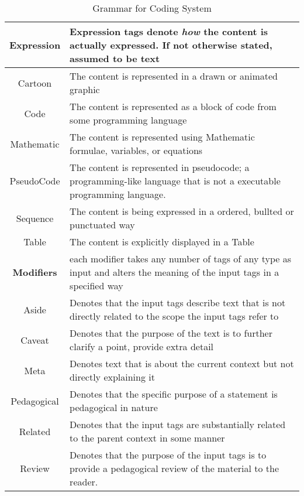 \begin{table}[h!]
\begin{tabular}{c p{1.8\linewidth}}
    
    \textbf{Expression} & Expression tags denote \emph{how }the content is actually expressed. If not otherwise stated, assumed to be text \\
    \hline
    Cartoon & The content is represented in a drawn or animated graphic\\
    Code & The content is represented as a block of code from some programming language\\
    Mathematic & The content is represented using Mathematic formulae, variables, or equations\\
    PseudoCode & The content is represented in pseudocode; a programming-like language that is not a executable programming language.\\
    Sequence & The content is being expressed in a ordered, bullted or punctuated way\\
    Table & The content is explicitly displayed in a Table\\


    \textbf{Modifiers} & each modifier takes any number of tags of any type as input and alters the meaning of the input tags in a specified way \\
    \hline
    Aside & Denotes that the input tags describe text that is not directly related to the scope the input tags refer to \\
    Caveat & Denotes that the purpose of the text is to further clarify a point, provide extra detail\\
    Meta & Denotes text that is about the current context but not directly explaining it\\
    Pedagogical & Denotes that the specific purpose of a statement is pedagogical in nature\\
    Related & Denotes that the input tags are substantially related to the parent context in some manner\\
    Review & Denotes that the purpose of the input tags is to provide a pedagogical review of the material to the reader.\\
  \end{tabular}
  \caption{Grammar for Coding System}
  \label{res:tbl:grmr}
\end{table}
